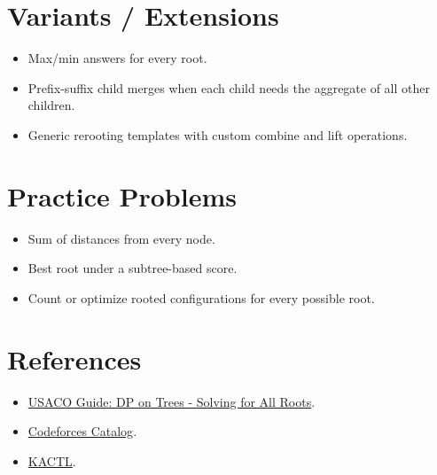 \section*{Variants / Extensions}

\begin{itemize}
  \item Max/min answers for every root.
  \item Prefix-suffix child merges when each child needs the aggregate of all other children.
  \item Generic rerooting templates with custom combine and lift operations.
\end{itemize}

\section*{Practice Problems}

\begin{itemize}
  \item Sum of distances from every node.
  \item Best root under a subtree-based score.
  \item Count or optimize rooted configurations for every possible root.
\end{itemize}

\section*{References}

\begin{itemize}
  \item \href{https://usaco.guide/gold/all-roots?lang=cpp}{USACO Guide: DP on Trees - Solving for All Roots}.
  \item \href{https://codeforces.com/catalog?locale=en}{Codeforces Catalog}.
  \item \href{https://github.com/kth-competitive-programming/kactl}{KACTL}.
\end{itemize}

